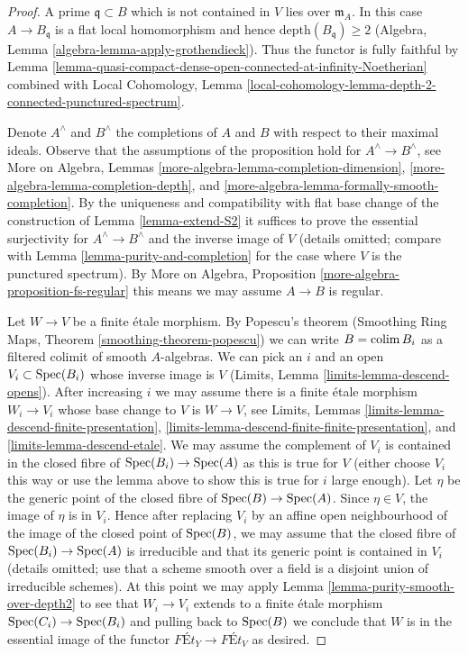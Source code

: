 \begin{proof}
A prime $\mathfrak q \subset B$ which is not contained in $V$
lies over $\mathfrak m_A$. In this case $A \to B_\mathfrak q$
is a flat local homomorphism and hence $\text{depth}(B_\mathfrak q) \geq 2$
(Algebra, Lemma \ref{algebra-lemma-apply-grothendieck}).
Thus the functor is fully faithful by
Lemma \ref{lemma-quasi-compact-dense-open-connected-at-infinity-Noetherian}
combined with Local Cohomology,
Lemma \ref{local-cohomology-lemma-depth-2-connected-punctured-spectrum}.

\medskip\noindent
Denote $A^\wedge$ and $B^\wedge$ the completions of $A$ and $B$
with respect to their maximal ideals. Observe that the assumptions
of the proposition hold for $A^\wedge \to B^\wedge$, see
More on Algebra, Lemmas
\ref{more-algebra-lemma-completion-dimension},
\ref{more-algebra-lemma-completion-depth}, and
\ref{more-algebra-lemma-formally-smooth-completion}.
By the uniqueness and compatibility with flat base change
of the construction of  Lemma \ref{lemma-extend-S2}
it suffices to prove the essential surjectivity for
$A^\wedge \to B^\wedge$ and the inverse image of $V$
(details omitted; compare with Lemma \ref{lemma-purity-and-completion}
for the case where $V$ is the punctured spectrum).
By More on Algebra, Proposition \ref{more-algebra-proposition-fs-regular}
this means we may assume $A \to B$ is regular.

\medskip\noindent
Let $W \to V$ be a finite \'etale morphism.
By Popescu's theorem
(Smoothing Ring Maps, Theorem \ref{smoothing-theorem-popescu})
we can write $B = \mathop{\mathrm{colim}}\nolimits B_i$ as a filtered colimit
of smooth $A$-algebras. We can pick an $i$ and an
open $V_i \subset \mathop{\mathrm{Spec}}(B_i)$ whose inverse image is $V$
(Limits, Lemma \ref{limits-lemma-descend-opens}).
After increasing $i$ we may assume there is a finite
\'etale morphism $W_i \to V_i$ whose base change to $V$
is $W \to V$, see
Limits, Lemmas \ref{limits-lemma-descend-finite-presentation},
\ref{limits-lemma-descend-finite-finite-presentation}, and
\ref{limits-lemma-descend-etale}.
We may assume the complement of $V_i$ is contained
in the closed fibre of $\mathop{\mathrm{Spec}}(B_i) \to \mathop{\mathrm{Spec}}(A)$ as this
is true for $V$ (either choose $V_i$ this way or use
the lemma above to show this is true for $i$ large enough).
Let $\eta$ be the generic point of the closed fibre
of $\mathop{\mathrm{Spec}}(B) \to \mathop{\mathrm{Spec}}(A)$. Since $\eta \in V$, the image of
$\eta$ is in $V_i$. Hence after replacing $V_i$ by an
affine open neighbourhood of the image of the closed point
of $\mathop{\mathrm{Spec}}(B)$, we may assume that the closed fibre
of $\mathop{\mathrm{Spec}}(B_i) \to \mathop{\mathrm{Spec}}(A)$ is irreducible and that
its generic point is contained in $V_i$ (details omitted; use that
a scheme smooth over a field is a disjoint union of irreducible schemes).
At this point we may apply Lemma \ref{lemma-purity-smooth-over-depth2}
to see that $W_i \to V_i$ extends to a finite \'etale
morphism $\mathop{\mathrm{Spec}}(C_i) \to \mathop{\mathrm{Spec}}(B_i)$ and pulling
back to $\mathop{\mathrm{Spec}}(B)$ we conclude that $W$ is in
the essential image of the functor
$\textit{F\'Et}_Y \to \textit{F\'Et}_V$
as desired.
\end{proof}





